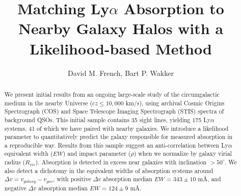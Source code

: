 \documentclass[iop]{emulateapj-rtx4}
\begin{document}

\title{Matching Ly$\alpha$ Absorption to Nearby Galaxy Halos with a Likelihood-based Method}

\author{David M. French, Bart P. Wakker}



\begin{abstract}

We present initial results from an ongoing large-scale study of the circumgalactic medium in the nearby Universe ($cz \leq 10,000$ km/s), using archival Cosmic Origins Spectrograph (COS) and Space Telescope Imaging Spectrograph (STIS) spectra of background QSOs. This initial sample contains 35 sight lines, yielding 175 Ly$\alpha$ systems, 41 of which we have paired with nearby galaxies. We introduce a likelihood parameter to quantitatively predict the galaxy responsible for measured absorption in a reproducible way. Results from this sample suggest an anti-correlation between Ly$\alpha$ equivalent width ($EW$) and impact parameter ($\rho$) when we normalize by galaxy virial radius ($R_{vir}$). Absorption is detected in excess near galaxies with inclination $>50^\circ$. We also detect a dichotomy in the equivalent widths of absorption systems around $\Delta v = v_{galaxy} - v_{gas}$, with positive $\Delta v$ absorption median $EW$ = $343 \pm 10$ m\AA, and negative $\Delta v$  absorption median $EW$ = $124 \pm 9$ m\AA. 




\end{abstract}
\end{document}
